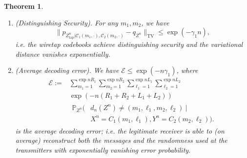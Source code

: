 \documentclass[journal]{IEEEtran}
\newcommand{\channelpmf}{q}
\newcommand{\codebookpmf}{p}
\newcommand{\codebookRateOne}{R_1}
\newcommand{\codebookRateTwo}{R_2}
\newcommand{\channelInOne}{X}
\newcommand{\channelInTwo}{Y}
\newcommand{\channelOut}{Z}
\newcommand{\channelOutWiretapper}{\channelOut_\mathrm{tap}}
\newcommand{\codebookOne}{\mathcal{C}_1}
\newcommand{\codebookTwo}{\mathcal{C}_2}
\newcommand{\codebookOneWord}[1]{C_1(#1)}
\newcommand{\codebookTwoWord}[1]{C_2(#1)}
\newcommand{\codewordIndex}{m}
\newcommand{\codebookBlocklength}{n}
\newcommand{\finalconstOne}{\gamma_1}
\newcommand{\totalvariation}[1]{\lVert #1 \rVert_\mathrm{TV}}
\newcommand{\Probability}{\mathbb{P}}
\newcommand{\codebookDecoder}{d}
\newcommand{\errorprob}{\mathcal{E}}
\newcommand{\codebookRandRateOne}{{L_1}}
\newcommand{\codebookRandRateTwo}{{L_2}}
\newcommand{\randomnessIndex}{\ell}
\newtheorem{theorem}{Theorem}
\begin{document}
\begin{theorem}
\begin{enumerate}
 \item \emph{(Distinguishing Security)}. For any $\codewordIndex_1, \codewordIndex_2$, we have
\[
\totalvariation{
  \codebookpmf_{\channelOutWiretapper^\codebookBlocklength | \codebookOne(\codewordIndex_1,\cdot), \codebookTwo(\codewordIndex_2, \cdot)} - \channelpmf_{\channelOut^\codebookBlocklength}
}
\leq
\exp(-\finalconstOne\codebookBlocklength),
\]
i.e. the wiretap codebooks achieve distinguishing security and the variational distance vanishes exponentially.
\item \emph{(Average decoding error)}. We have $\errorprob \leq \exp(-\codebookBlocklength\finalconstOne)$, where
\begin{align*}
\errorprob
:=
&\sum\limits_{\codewordIndex_1=1}^{\exp{\codebookBlocklength\codebookRateOne}}
\sum\limits_{\codewordIndex_2=1}^{\exp{\codebookBlocklength\codebookRateTwo}}
\sum\limits_{\randomnessIndex_1=1}^{\exp{\codebookBlocklength\codebookRandRateOne}}
\sum\limits_{\randomnessIndex_2=1}^{\exp{\codebookBlocklength\codebookRandRateTwo}}
\\
  &\exp(-\codebookBlocklength(\codebookRateOne+\codebookRateTwo+\codebookRandRateOne+\codebookRandRateTwo))
  \\
  &
  \begin{aligned}
    \Probability_{\channelOut^\codebookBlocklength} \Big(
          &\codebookDecoder_\codebookBlocklength(\channelOut^\codebookBlocklength) \neq (\codewordIndex_1, \randomnessIndex_1, \codewordIndex_2, \randomnessIndex_2)
          ~\big|~
          \\
          &\channelInOne^\codebookBlocklength = \codebookOneWord{\codewordIndex_1, \randomnessIndex_1},
          \channelInTwo^\codebookBlocklength = \codebookTwoWord{\codewordIndex_2, \randomnessIndex_2}
        \Big).
  \end{aligned}
\end{align*}
is the average decoding error; i.e. the legitimate receiver is able to (on average) reconstruct both the messages and the randomness used at the transmitters with exponentially vanishing error probability.
\end{enumerate}
\end{theorem}
\end{document}
